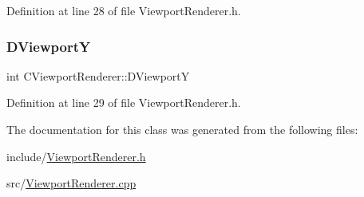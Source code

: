 Definition at line 28 of file Viewport\+Renderer.\+h.

\hypertarget{classCViewportRenderer_ae13dd437a3da3d2bab16bc7ba61cb78f}{}\label{classCViewportRenderer_ae13dd437a3da3d2bab16bc7ba61cb78f} 
\subsubsection{\texorpdfstring{D\+ViewportY}{DViewportY}}
{\footnotesize\ttfamily int C\+Viewport\+Renderer\+::\+D\+ViewportY\hspace{0.3cm}{\ttfamily [protected]}}



Definition at line 29 of file Viewport\+Renderer.\+h.



The documentation for this class was generated from the following files\+:\begin{DoxyCompactItemize}
\item 
include/\hyperlink{ViewportRenderer_8h}{Viewport\+Renderer.\+h}\item 
src/\hyperlink{ViewportRenderer_8cpp}{Viewport\+Renderer.\+cpp}\end{DoxyCompactItemize}
